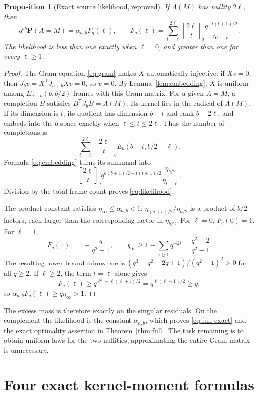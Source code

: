 \documentclass[11pt,letterpaper]{article}
\newtheorem{proposition}[theorem]{Proposition}
\theoremstyle{remark}
\newcommand{\Prob}{\mathbf P}
\newcommand{\qb}[2]{\genfrac{[}{]}{0pt}{}{#1}{#2}_{q}}
\begin{document}
\begin{proposition}[Exact source likelihood, reproved]\label{prop:likelihood}
If $\Lambda(M)$ has nullity $2\ell$, then
\begin{equation}\label{eq:likelihood}
 q^{ab}\Prob(A=M)=\alpha_{a,b}F_q(\ell),\qquad
 F_q(\ell)=\sum_{t=\ell}^{2\ell}
    \qb{2\ell}t\frac{q^{-t(t+1)/2}}{\eta_{t-\ell}}.
\end{equation}
The likelihood is less than one exactly when $\ell=0$, and greater than
one for every $\ell\ge1$.
\end{proposition}

\begin{proof}
The Gram equation \eqref{eq:gram} makes $X$ automatically injective: if
$Xv=0$, then $J_bv=X^{\mathsf T}J_{a+b}Xv=0$, so $v=0$.
By Lemma~\ref{lem:embedding}, $X$ is uniform among
$E_{a+b}(b,b/2)$ frames with this Gram matrix.
For a given $A=M$, a completion $B$ satisfies
$B^{\mathsf T}J_bB=\Lambda(M)$. Its kernel lies in the radical of
$\Lambda(M)$. If its dimension is $t$, its quotient has dimension $b-t$
and rank $b-2\ell$, and embeds into the $b$-space exactly when
$\ell\le t\le2\ell$. Thus the number of completions is
\[
 \sum_{t=\ell}^{2\ell}\qb{2\ell}t E_b(b-t,b/2-\ell).
\]
Formula \eqref{eq:embedding} turns its summand into
\[
 \qb{2\ell}t q^{b(b+1)/2-t(t+1)/2}
                    \frac{\eta_{b/2}}{\eta_{t-\ell}}.
\]
Division by the total frame count proves \eqref{eq:likelihood}.

The product constant satisfies $\eta_\infty\le\alpha_{a,b}<1$:
$\eta_{(a+b)/2}/\eta_{a/2}$ is a product of $b/2$ factors, each larger
than the corresponding factor in $\eta_{b/2}$. For $\ell=0$, $F_q(0)=1$.
For $\ell=1$,
\[
 F_q(1)=1+\frac q{q^2-1},\qquad
 \eta_\infty\ge 1-\sum_{i\ge1}q^{-2i}
                =\frac{q^2-2}{q^2-1}.
\]
The resulting lower bound minus one is
$(q^3-q^2-2q+1)/(q^2-1)^2>0$ for all $q\ge2$.
If $\ell\ge2$, the term $t=\ell$ alone gives
\[
 F_q(\ell)\ge q^{\ell^2-\ell(\ell+1)/2}
              =q^{\ell(\ell-1)/2}\ge q,
\]
so $\alpha_{a,b}F_q(\ell)\ge q\eta_\infty>1$.
\end{proof}

The excess mass is therefore exactly on the singular residuals. On the
complement the likelihood is the constant $\alpha_{a,b}$, which proves
\eqref{eq:full-exact} and the exact optimality assertion in
Theorem~\ref{thm:full}. The task remaining is to obtain uniform laws for
the two nullities; approximating the entire Gram matrix is unnecessary.

\section{Four exact kernel-moment formulas}
\end{document}
